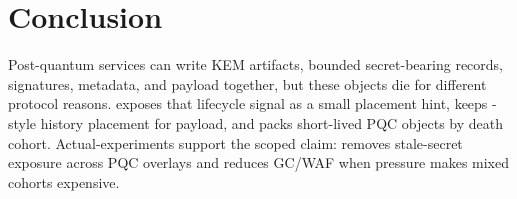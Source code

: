 \section{Conclusion}

Post-quantum services can write KEM artifacts, bounded secret-bearing records, signatures, metadata, and payload together, but these objects die for different protocol reasons.  \system exposes that lifecycle signal as a small placement hint, keeps \dogi-style history placement for payload, and packs short-lived PQC objects by death cohort.  Actual-\zns experiments support the scoped claim: \system removes stale-secret exposure across PQC overlays and reduces GC/WAF when pressure makes mixed cohorts expensive.
